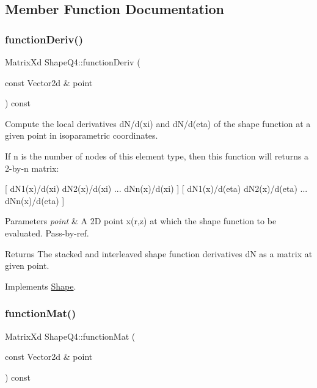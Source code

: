 \subsection{Member Function Documentation}
\mbox{\label{class_shape_q4_a23e45399e8867f74c47eb41a30328e3e}} 
\subsubsection{\texorpdfstring{function\+Deriv()}{functionDeriv()}}
{\footnotesize\ttfamily Matrix\+Xd Shape\+Q4\+::function\+Deriv (\begin{DoxyParamCaption}\item[{const Vector2d \&}]{point }\end{DoxyParamCaption}) const\hspace{0.3cm}{\ttfamily [virtual]}}



Compute the local derivatives d\+N/d(xi) and d\+N/d(eta) of the shape function at a given point in isoparametric coordinates. 

If n is the number of nodes of this element type, then this function will returns a 2-\/by-\/n matrix\+:

\mbox{[} d\+N1(x)/d(xi) d\+N2(x)/d(xi) ... d\+Nn(x)/d(xi) \mbox{]} \mbox{[} d\+N1(x)/d(eta) d\+N2(x)/d(eta) ... d\+Nn(x)/d(eta) \mbox{]}


\begin{DoxyParams}{Parameters}
{\em point} & A 2D point x(r,z) at which the shape function to be evaluated. Pass-\/by-\/ref. \\
\hline
\end{DoxyParams}
\begin{DoxyReturn}{Returns}
The stacked and interleaved shape function derivatives dN as a matrix at given point. 
\end{DoxyReturn}


Implements \mbox{\hyperlink{class_shape_a29de5d31e0fa74a4d1067f6d14cd94ed}{Shape}}.

\mbox{\label{class_shape_q4_a9a74aff61bbcbfa73480cbe520a21563}} 
\subsubsection{\texorpdfstring{function\+Mat()}{functionMat()}}
{\footnotesize\ttfamily Matrix\+Xd Shape\+Q4\+::function\+Mat (\begin{DoxyParamCaption}\item[{const Vector2d \&}]{point }\end{DoxyParamCaption}) const\hspace{0.3cm}{\ttfamily [virtual]}}



